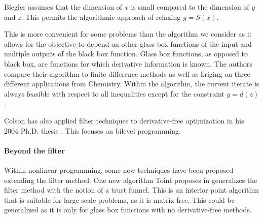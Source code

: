 \documentclass{article}
\begin{document}
Biegler assumes that the dimension of $x$ is small compared to the dimension of $y$ and $z$.
This permits the algorithmic approach of relaxing $y=S(x)$.

This is more convenient for some problems than the algorithm we consider as it allows for the objective to depend on other glass box functions of the input and multiple outputs of the black box function.
Glass box functions, as opposed to black box, are functions for which derivative information is known.
The authors compare their algorithm to finite difference methods as well as kriging on three different applications from Chemistry. 
Within the algorithm, the current iterate is always feasible with respect to all inequalities except for the constraint $y=d(z)$.

Colson has also applied filter techniques to derivative-free optimization in his 2004 Ph.D. thesis \cite{DUMMY:Colson2004}.
This focuses on bilevel programming.

\paragraph{Beyond the filter}
Within nonlinear programming, some new techniques have been proposed extending the filter method.
One new algorithm Toint proposes in \cite{DUMMY:trust_funnel_dfo} generalizes the filter method with the notion of a trust funnel.
This is an interior point algorithm that is suitable for large scale problems, as it is matrix free.
This could be generalized as it is only for glass box functions with no derivative-free methods.






\end{document}
